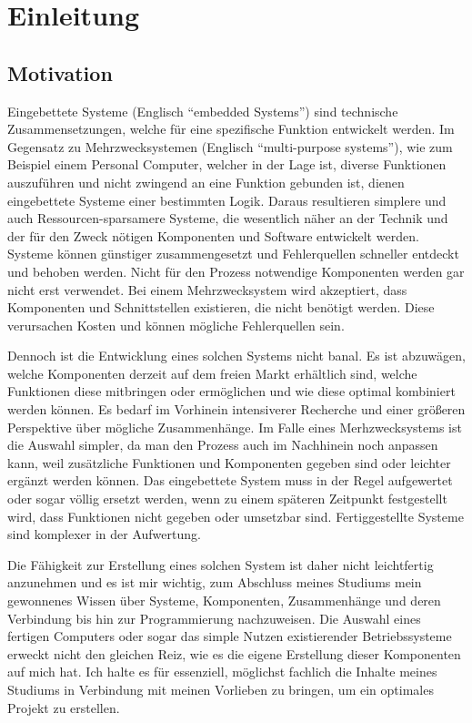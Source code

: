 \hypertarget{einleitung}{%
\chapter{Einleitung}\label{einleitung}}

\hypertarget{motivation}{%
\section{Motivation}\label{motivation}}

Eingebettete Systeme (Englisch ``embedded Systems'') sind technische
Zusammensetzungen, welche für eine spezifische Funktion entwickelt
werden. Im Gegensatz zu Mehrzwecksystemen (Englisch ``multi-purpose
systems''), wie zum Beispiel einem Personal Computer, welcher in der
Lage ist, diverse Funktionen auszuführen und nicht zwingend an eine
Funktion gebunden ist, dienen eingebettete Systeme einer bestimmten
Logik. Daraus resultieren simplere und auch Ressourcen-sparsamere
Systeme, die wesentlich näher an der Technik und der für den Zweck
nötigen Komponenten und Software entwickelt werden. Systeme können
günstiger zusammengesetzt und Fehlerquellen schneller entdeckt und
behoben werden. Nicht für den Prozess notwendige Komponenten werden gar
nicht erst verwendet. Bei einem Mehrzwecksystem wird akzeptiert, dass
Komponenten und Schnittstellen existieren, die nicht benötigt werden.
Diese verursachen Kosten und können mögliche Fehlerquellen sein.

Dennoch ist die Entwicklung eines solchen Systems nicht banal. Es ist
abzuwägen, welche Komponenten derzeit auf dem freien Markt erhältlich
sind, welche Funktionen diese mitbringen oder ermöglichen und wie diese
optimal kombiniert werden können. Es bedarf im Vorhinein intensiverer
Recherche und einer größeren Perspektive über mögliche Zusammenhänge. Im
Falle eines Merhzwecksystems ist die Auswahl simpler, da man den Prozess
auch im Nachhinein noch anpassen kann, weil zusätzliche Funktionen und
Komponenten gegeben sind oder leichter ergänzt werden können. Das
eingebettete System muss in der Regel aufgewertet oder sogar völlig
ersetzt werden, wenn zu einem späteren Zeitpunkt festgestellt wird, dass
Funktionen nicht gegeben oder umsetzbar sind. Fertiggestellte Systeme
sind komplexer in der Aufwertung.

Die Fähigkeit zur Erstellung eines solchen System ist daher nicht
leichtfertig anzunehmen und es ist mir wichtig, zum Abschluss meines
Studiums mein gewonnenes Wissen über Systeme, Komponenten, Zusammenhänge
und deren Verbindung bis hin zur Programmierung nachzuweisen. Die
Auswahl eines fertigen Computers oder sogar das simple Nutzen
existierender Betriebssysteme erweckt nicht den gleichen Reiz, wie es
die eigene Erstellung dieser Komponenten auf mich hat. Ich halte es für
essenziell, möglichst fachlich die Inhalte meines Studiums in Verbindung
mit meinen Vorlieben zu bringen, um ein optimales Projekt zu erstellen.

